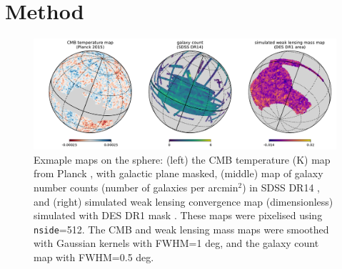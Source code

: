 \documentclass[final,twocolumn,3p,times,authoryear]{elsarticle}
\newcommand{\1}{\b{1}}              %
\newcommand{\0}{\b{0}}              %
\begin{document}


\section{Method}
\label{sec:method}

\begin{figure}
\includegraphics[width=\linewidth]{figures/figure_example_maps.pdf}
\caption{Exmaple maps on the sphere:
(left) the CMB temperature (K) map from Planck \citep{planck2015overview}, with galactic plane masked,
(middle) map of galaxy number counts (number of galaxies per arcmin$^2$) in SDSS DR14 \citep{abolfathi2017sdssDR14},
and (right) simulated weak lensing convergence map (dimensionless) simulated with DES DR1 mask \citep{des2018dr1}.
These maps were pixelised using \texttt{nside}=512.
The CMB and weak lensing mass maps were smoothed with Gaussian kernels with FWHM=1 deg, and the galaxy count map with FWHM=0.5 deg.
}
\label{fig:example_maps}
\end{figure}
\end{document}
